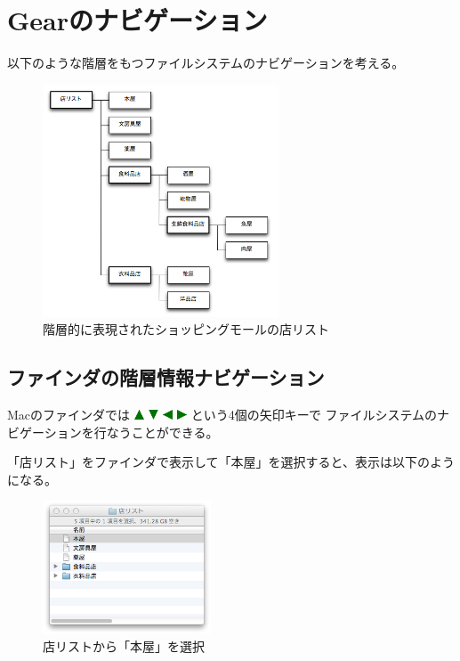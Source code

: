 \documentclass[twoside]{wiss}
\def\GEAR{\textsf{Gear}}
\def\figwidth{50mm}
\def\up{ \includegraphics[width=3mm,bb=0 0 36 36]{figures/uptriangle.pdf} }
\def\down{ \includegraphics[width=3mm,bb=0 0 36 36]{figures/downtriangle.pdf} }
\def\right{ \includegraphics[width=3mm,bb=0 0 36 36]{figures/righttriangle.pdf} }
\def\left{ \includegraphics[width=3mm,bb=0 0 36 36]{figures/lefttriangle.pdf} }
\begin{document}


\section{{\GEAR}のナビゲーション}
\label{description}

% 

以下のような階層をもつファイルシステムのナビゲーションを考える。

\begin{figure}[H]
\centerline{\includegraphics[width=70mm,bb=0 0 509 502]{figures/ae9216b00626f9c4eea44cc380f25886.png}}
\caption{階層的に表現されたショッピングモールの店リスト}
\label{screenshot1}
\end{figure}

\subsection{ファインダの階層情報ナビゲーション}

Macのファインダでは
{\up}{\down}{\left}{\right}という4個の矢印キーで
ファイルシステムのナビゲーションを行なうことができる。

「店リスト」をファインダで表示して「本屋」を選択すると、表示は以下のようになる。

\begin{figure}[H]
\centerline{\includegraphics[width=\figwidth,bb=0 0 344 272]{figures/9b121bec45e5b480e5ac64fdd0f82592.png}}
\caption{店リストから「本屋」を選択}
\label{screenshot2}
\end{figure}
\end{document}
